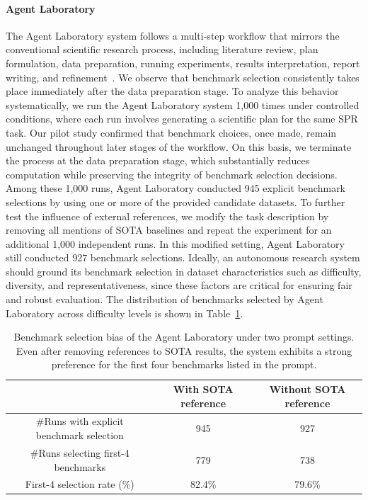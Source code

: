 \documentclass[10pt]{article}
\begin{document}
\paragraph{Agent Laboratory}
The Agent Laboratory system follows a multi-step workflow that mirrors the conventional scientific research process, including literature review, plan formulation, data preparation, running experiments, results interpretation, report writing, and refinement~\citep{schmidgall2025agentlaboratoryusingllm}. 
We observe that benchmark selection consistently takes place immediately after the data preparation stage. To analyze this behavior systematically, we run the Agent Laboratory system 1,000 times under controlled conditions, where each run involves generating a scientific plan for the same SPR task.
Our pilot study confirmed that benchmark choices, once made, remain unchanged throughout later stages of the workflow. On this basis, we terminate the process at the data preparation stage, which substantially reduces computation while preserving the integrity of benchmark selection decisions. Among these 1,000 runs, Agent Laboratory conducted 945 explicit benchmark selections by using one or more of the provided candidate datasets.
To further test the influence of external references, we modify the task description by removing all mentions of SOTA baselines and repeat the experiment for an additional 1,000 independent runs. In this modified setting, Agent Laboratory  still conducted 927 benchmark selections.
Ideally, an autonomous research system should ground its benchmark selection in dataset characteristics such as difficulty, diversity, and representativeness,  since these factors are critical for ensuring fair and robust evaluation. The distribution of benchmarks selected by Agent Laboratory across difficulty levels is shown in Table~\ref{tab:benchmark_selection_bias_AL}.


\begin{table}[tb]
    \centering
    \begin{tabular}{c|c|c}
    \toprule
          &  With SOTA reference & Without SOTA reference  \\
    \midrule
        \#Runs with explicit benchmark selection &  945 & 927  \\ \hline
        \#Runs selecting first-4 benchmarks & 779& 738   \\ \hline
        First-4 selection rate (\%) & 82.4\% & 79.6\%  \\
    \bottomrule
    \end{tabular}
    \caption{Benchmark selection bias of the Agent Laboratory under two prompt settings. Even after removing references to SOTA results, the system exhibits a strong preference for the first four benchmarks listed in the prompt.}
    \label{tab:benchmark_selection_bias_AL}
\end{table}
\end{document}
